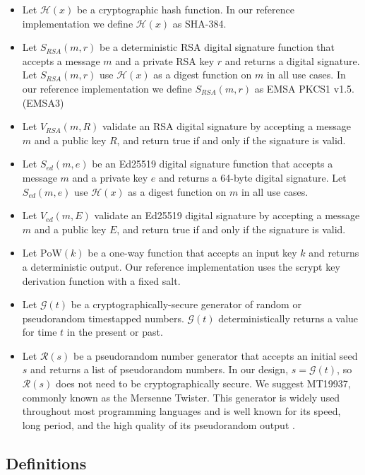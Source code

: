 \documentclass[USenglish,oneside,twocolumn]{article}
\begin{document}
\begin{itemize}
	\item Let $ \mathcal{H}(x) $ be a cryptographic hash function. In our reference implementation we define $ \mathcal{H}(x) $ as SHA-384.
	\item Let $ S_{\mathit{RSA}}(m, r) $ be a deterministic RSA digital signature function that accepts a message $ m $ and a private RSA key $ r $ and returns a digital signature. Let $ S_{\mathit{RSA}}(m, r) $ use $ \mathcal{H}(x) $ as a digest function on $ m $ in all use cases. In our reference implementation we define $ S_{\mathit{RSA}}(m, r) $ as EMSA PKCS1 v1.5. (EMSA3)
	\item Let $ V_{\mathit{RSA}}(m, R) $ validate an RSA digital signature by accepting a message $ m $ and a public key $ R $, and return true if and only if the signature is valid.
	\item Let $ S_{\mathit{ed}}(m, e) $ be an Ed25519 digital signature function that accepts a message $ m $ and a private key $ e $ and returns a 64-byte digital signature. Let $ S_{\mathit{ed}}(m, e) $ use $ \mathcal{H}(x) $ as a digest function on $ m $ in all use cases.
	\item Let $ V_{\mathit{ed}}(m, E) $ validate an Ed25519 digital signature by accepting a message $ m $ and a public key $ E $, and return true if and only if the signature is valid.
	\item Let $ \mathrm{PoW}(k) $ be a one-way function that accepts an input key $ k $ and returns a deterministic output. Our reference implementation uses the scrypt \cite{percival2012scrypt} key derivation function with a fixed salt.
	\item Let $ \mathcal{G}(t) $ be a cryptographically-secure generator of random or pseudorandom timestapped numbers. $ \mathcal{G}(t) $ deterministically returns a value for time $ t $ in the present or past.
	\item Let $ \mathcal{R}(s) $ be a pseudorandom number generator that accepts an initial seed $ s $ and returns a list of pseudorandom numbers. In our design, $ s = \mathcal{G}(t) $, so $ \mathcal{R}(s) $ does not need to be cryptographically secure. We suggest MT19937, commonly known as the Mersenne Twister. This generator is widely used throughout most programming languages and is well known for its speed, long period, and the high quality of its pseudorandom output \cite{matsumoto1998mersenne}.
\end{itemize}

\subsection{Definitions}
\end{document}
